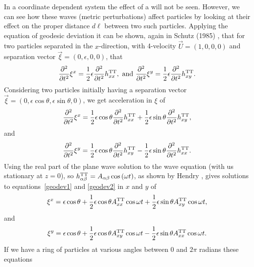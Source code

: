 In a coordinate dependent system the effect of a \gw will not be seen. However, we can see how these
waves (metric perturbations) affect particles by looking at their effect on the proper distance
$d\ell$ between two such particles. Applying the equation of geodesic deviation it can be shown,
again in Schutz (1985) \cite{Schutz:1985}, that for two particles separated in the $x$-direction,
with 4-velocity $\vec{U} = (1,0,0,0)$ and separation vector $\vec{\xi} = (0,\epsilon,0,0)$, that
\begin{equation}\label{gwmotion}
\frac{\partial^2}{\partial{}t^2}\xi^x = \frac{1}{2}\epsilon\frac{\partial^2}{\partial{}t^2}
h_{xx}^{\rm TT},~{\rm and}~
\frac{\partial^2}{\partial{}t^2}\xi^y = \frac{1}{2}\epsilon\frac{\partial^2}{\partial{}t^2}
h_{xy}^{\rm TT}.
\end{equation}
Considering two particles initially having a separation vector $\vec{\xi} =
(0,\epsilon\cos{\theta}, \epsilon\sin{\theta}, 0)$, we get acceleration in $\xi$ of
\begin{equation}\label{geodev1}
\frac{\partial^2}{\partial{}t^2}\xi^x = \frac{1}{2} \epsilon \cos{\theta}
\frac{\partial^2}{\partial{}t^2} h_{xx}^{\rm TT} + \frac{1}{2} \epsilon \sin{\theta}
\frac{\partial^2}{\partial{}t^2} h_{xy}^{\rm TT},
\end{equation}
and
\begin{equation}\label{geodev2}
\frac{\partial^2}{\partial{}t^2}\xi^y = \frac{1}{2} \epsilon \cos{\theta}
\frac{\partial^2}{\partial{}t^2} h_{xy}^{\rm TT} - \frac{1}{2} \epsilon \sin{\theta}
\frac{\partial^2}{\partial{}t^2} h_{xx}^{\rm TT}.
\end{equation}
Using the real part of the plane wave solution to the wave equation (with us stationary at $z=0$),
so $h_{\alpha\beta}^{\rm TT} = A_{\alpha\beta}\cos{(\omega{}t)}$, as shown by Hendry
\cite{Hendry:2005}, gives
solutions to equations~\ref{geodev1} and \ref{geodev2} in $x$ and $y$ of
\begin{equation}\label{gwmotionx}
\xi^x = \epsilon\cos{\theta} + \frac{1}{2}\epsilon\cos{\theta}A_{xx}^{\rm TT}\cos{\omega{}t} +
\frac{1}{2}\epsilon\sin{\theta}A_{xy}^{\rm TT}\cos{\omega{}t},
\end{equation}
and
\begin{equation}\label{gwmotiony}
\xi^y = \epsilon\cos{\theta} + \frac{1}{2}\epsilon\cos{\theta}A_{xy}^{\rm TT}\cos{\omega{}t} -
\frac{1}{2}\epsilon\sin{\theta}A_{xx}^{\rm TT}\cos{\omega{}t}.
\end{equation}
If we have a ring of particles at various angles between 0 and $2\pi$ radians these equations
